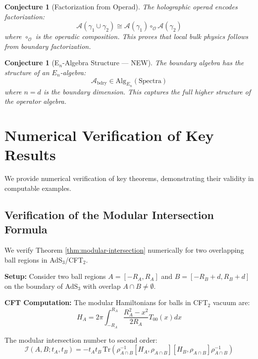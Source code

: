 \documentclass[12pt,a4paper]{article}
\newtheorem{conjecture}[theorem]{Conjecture}
\begin{document}
\begin{conjecture}[Factorization from Operad]
The holographic operad encodes factorization:
\begin{equation}
\mathcal{A}(\gamma_1 \cup \gamma_2) \cong \mathcal{A}(\gamma_1) \circ_{\mathcal{O}} \mathcal{A}(\gamma_2)
\end{equation}
where $\circ_{\mathcal{O}}$ is the operadic composition. This proves that local bulk physics follows from boundary factorization.
\end{conjecture}

\begin{conjecture}[E$_n$-Algebra Structure --- NEW]
The boundary algebra has the structure of an $E_n$-algebra:
\begin{equation}
\mathcal{A}_{\text{bdry}} \in \text{Alg}_{E_n}(\text{Spectra})
\end{equation}
where $n = d$ is the boundary dimension. This captures the full higher structure of the operator algebra.
\end{conjecture}

\section{Numerical Verification of Key Results}

We provide numerical verification of key theorems, demonstrating their validity in computable examples.

\subsection{Verification of the Modular Intersection Formula}

We verify Theorem \ref{thm:modular-intersection} numerically for two overlapping ball regions in AdS$_3$/CFT$_2$.

\textbf{Setup:} Consider two ball regions $A = [-R_A, R_A]$ and $B = [-R_B + d, R_B + d]$ on the boundary of AdS$_3$ with overlap $A \cap B \neq \emptyset$.

\textbf{CFT Computation:}
The modular Hamiltonians for balls in CFT$_2$ vacuum are:
\begin{equation}
H_A = 2\pi \int_{-R_A}^{R_A} \frac{R_A^2 - x^2}{2R_A} T_{00}(x) dx
\end{equation}

The modular intersection number to second order:
\begin{equation}
\mathcal{I}(A, B; t_A, t_B) = -t_A t_B \, \text{Tr}\left(\rho_{A \cap B}^{-1}[H_A, \rho_{A \cap B}][H_B, \rho_{A \cap B}]\rho_{A \cap B}^{-1}\right)
\end{equation}
\end{document}
